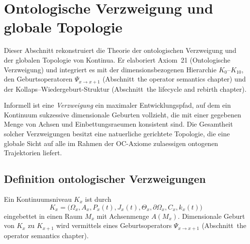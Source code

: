 
\section{Ontologische Verzweigung und globale Topologie}
\label{sec:branching-topology}

Dieser Abschnitt rekonstruiert die Theorie der ontologischen Verzweigung und der
globalen Topologie von Kontinua. Er elaboriert Axiom~21 (Ontologische Verzweigung)
und integriert es mit der dimensionsbezogenen Hierarchie \(K_0\)–\(K_{10}\), den
Geburtsoperatoren \(\Psi_{x\to x+1}\) (Abschnitt~the operator semantics chapter) und der
Kollaps--Wiedergeburt-Struktur (Abschnitt~the lifecycle and rebirth chapter).

Informell ist eine \emph{Verzweigung} ein maximaler Entwicklungspfad, auf dem ein
Kontinuum sukzessive dimensionale Geburten vollzieht, die mit einer gegebenen
Menge von Achsen und Einbettungsraeumen konsistent sind. Die Gesamtheit
solcher Verzweigungen besitzt eine natuerliche gerichtete Topologie, die eine
globale Sicht auf alle im Rahmen der OC-Axiome zulaessigen ontogenen Trajektorien
liefert.

\subsection{Definition ontologischer Verzweigungen}

Ein Kontinuumsniveau \(K_x\) ist durch
\[
  K_x =
  \big(
    \Omega_x, A_x, P_x(t), J_x(t),
    \Theta_x, \partial\Omega_x, C_x, k_x(t)
  \big)
\]
eingebettet in einen Raum \(M_x\) mit Achsenmenge \(A(M_x)\). Dimensionale Geburt
von \(K_x\) zu \(K_{x+1}\) wird vermittels eines Geburtsoperators
\(\Psi_{x\to x+1}\) (Abschnitt~the operator semantics chapter).

